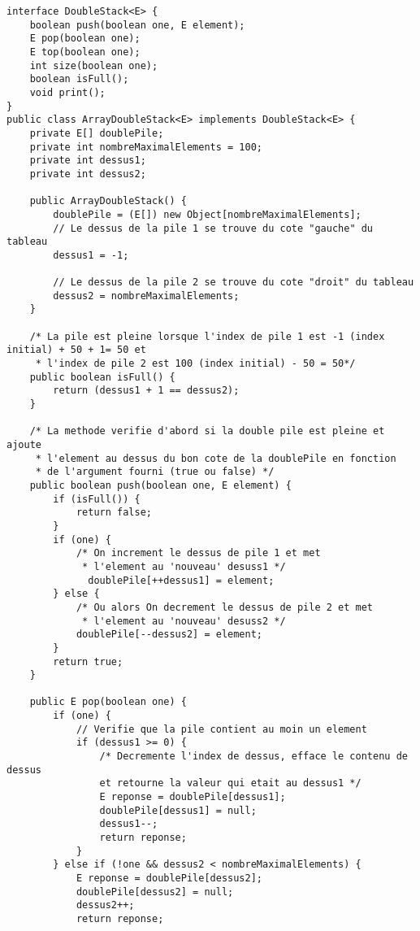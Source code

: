 \documentclass[10pt]{report}
\begin{document}
    \begin{lstlisting}[style=JavaDraculaWhite]
 interface DoubleStack<E> {
    boolean push(boolean one, E element);
    E pop(boolean one);
    E top(boolean one);
    int size(boolean one);
    boolean isFull();
    void print();
}      
public class ArrayDoubleStack<E> implements DoubleStack<E> {
    private E[] doublePile;
    private int nombreMaximalElements = 100;
    private int dessus1;
    private int dessus2;

    public ArrayDoubleStack() {
        doublePile = (E[]) new Object[nombreMaximalElements];
        // Le dessus de la pile 1 se trouve du cote "gauche" du tableau
        dessus1 = -1;

        // Le dessus de la pile 2 se trouve du cote "droit" du tableau
        dessus2 = nombreMaximalElements;
    }

    /* La pile est pleine lorsque l'index de pile 1 est -1 (index initial) + 50 + 1= 50 et 
     * l'index de pile 2 est 100 (index initial) - 50 = 50*/
    public boolean isFull() {
        return (dessus1 + 1 == dessus2);
    }

    /* La methode verifie d'abord si la double pile est pleine et ajoute 
     * l'element au dessus du bon cote de la doublePile en fonction 
     * de l'argument fourni (true ou false) */
    public boolean push(boolean one, E element) {
        if (isFull()) {
            return false;
        }
        if (one) {
            /* On increment le dessus de pile 1 et met 
             * l'element au 'nouveau' desuss1 */
              doublePile[++dessus1] = element;
        } else {
            /* Ou alors On decrement le dessus de pile 2 et met 
             * l'element au 'nouveau' desuss2 */
            doublePile[--dessus2] = element;
        }
        return true;
    }
    
    public E pop(boolean one) {
        if (one) {
            // Verifie que la pile contient au moin un element
            if (dessus1 >= 0) {
                /* Decremente l'index de dessus, efface le contenu de dessus 
                et retourne la valeur qui etait au dessus1 */ 
                E reponse = doublePile[dessus1];
                doublePile[dessus1] = null; 
                dessus1--; 
                return reponse;
            }
        } else if (!one && dessus2 < nombreMaximalElements) {
            E reponse = doublePile[dessus2]; 
            doublePile[dessus2] = null;
            dessus2++;
            return reponse;  
            

\end{lstlisting}
\end{document}
